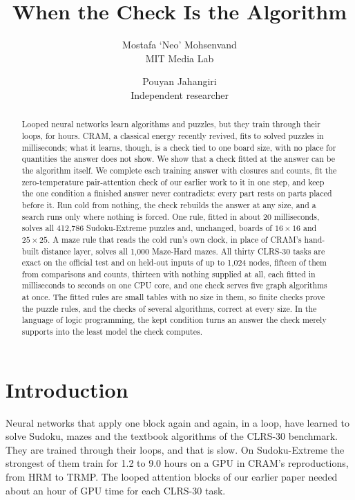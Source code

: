\documentclass[10pt]{article}
\title{When the Check Is the Algorithm}
\author{Mostafa `Neo' Mohsenvand\\ {\small MIT Media Lab} \and Pouyan Jahangiri\\ {\small Independent researcher}}
\date{}
\begin{document}
\maketitle

\begin{abstract}
\noindent Looped neural networks learn algorithms and puzzles, but they train through their loops, for hours. CRAM, a
classical energy recently revived, fits to solved puzzles in milliseconds; what it learns, though, is a check tied to one
board size, with no place for quantities the answer does not show. We show that a check fitted at the answer can be the
algorithm itself. We complete each training answer with closures and counts, fit the zero-temperature
pair-attention check of our earlier work to it in one step, and keep the one condition a finished answer never
contradicts: every part rests on parts placed before it. Run cold from nothing, the check rebuilds the answer at any
size, and a search runs only where nothing is forced. One rule, fitted in about 20 milliseconds, solves all
412,786 Sudoku-Extreme puzzles and, unchanged, boards of $16\times16$ and $25\times25$. A maze rule that reads the cold run's own clock, in place of CRAM's hand-built distance layer, solves all 1,000
Maze-Hard mazes. All thirty CLRS-30 tasks are exact on the
official test and on held-out inputs of up to 1,024 nodes, fifteen of them from comparisons and
counts, thirteen with nothing supplied at all, each fitted in milliseconds to seconds on one CPU core, and one check serves five graph algorithms at once. The fitted rules are small tables with no size in
them, so finite checks prove the puzzle rules, and the checks of several algorithms, correct at every size. In the language of logic programming, the kept condition
turns an answer the check merely supports into the least model the check computes.
\end{abstract}

\section{Introduction}

Neural networks that apply one block again and again, in a loop, have learned to solve Sudoku, mazes and the textbook
algorithms of the CLRS-30 benchmark\cite{wang2025hrm,jolicoeur2025trm,velickovic2022clrs,bansal2022end}. They are
trained through their loops, and that is slow. On Sudoku-Extreme the strongest of them train for 1.2 to
9.0 hours on a GPU in CRAM's reproductions\cite{hoover2026classical}, from HRM to
TRMP\cite{wang2025hrm,jolicoeur2025trm,salvatori2026tiny,chen2026energy}. The looped attention blocks of our earlier paper needed
about an hour of GPU time for each CLRS-30 task\cite{mohsenvand2026zero}.
\end{document}
